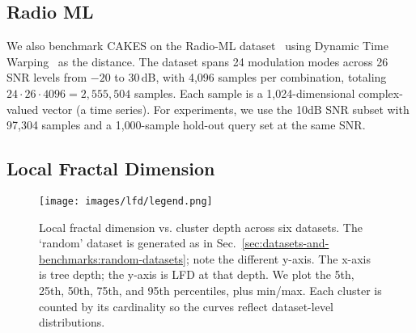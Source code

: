 \subsection{Radio ML}
\label{sec:datasets-and-benchmarks:radio-ml}

We also benchmark CAKES on the Radio-ML dataset~\cite{oshea2018radioml} using Dynamic Time Warping~\cite{muller2007dynamic} as the distance. The dataset spans 24 modulation modes across 26 SNR levels from $-20$ to $30$\,dB, with 4{,}096 samples per combination, totaling $24\!\cdot\!26\!\cdot\!4096=2{,}555{,}504$ samples. Each sample is a 1{,}024-dimensional complex-valued vector (a time series). For experiments, we use the 10dB SNR subset with 97{,}304 samples and a 1{,}000-sample hold-out query set at the same SNR.



\subsection{Local Fractal Dimension}
\label{sec:dayasets:lfd-of-datasets}

\begin{figure}[t]
    \centering
    \hfill
  
    \par\medskip
    \hfill
  
    \par\medskip
    \hfill
  
    \par\smallskip
    \texttt{[image: images/lfd/legend.png]}
  
    \caption{Local fractal dimension vs. cluster depth across six datasets. The ‘random’ dataset is generated as in Sec.~\ref{sec:datasets-and-benchmarks:random-datasets}; note the different y-axis. The x-axis is tree depth; the y-axis is LFD at that depth. We plot the 5th, 25th, 50th, 75th, and 95th percentiles, plus min/max. Each cluster is counted by its cardinality so the curves reflect dataset-level distributions.}
    \label{fig:results:lfd-plots}
  \end{figure}


